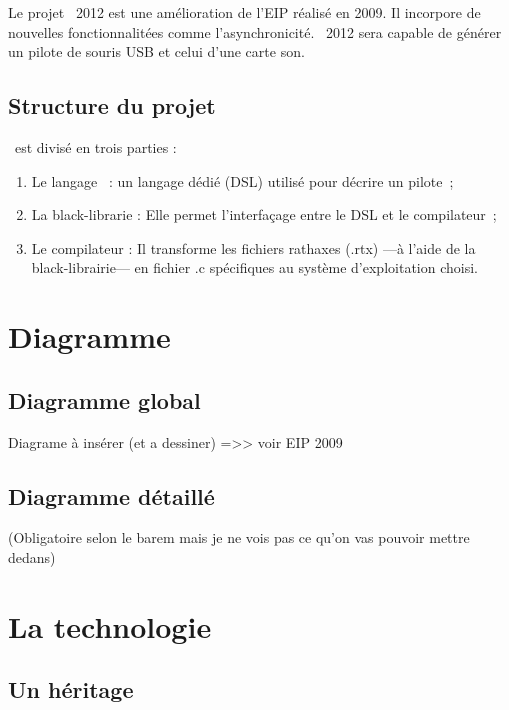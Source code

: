 \documentclass{rtxreport}
\begin{document}
Le projet \rtx\ 2012 est une amélioration de l'EIP réalisé en 2009. Il
incorpore de nouvelles fonctionnalitées comme l’asynchronicité. \rtx\ 2012 sera
capable de générer un pilote de souris USB et celui d'une carte son.

\section{Structure du projet}

\rtx\ est divisé en trois parties :

\begin{enumerate}
\item Le langage \rtx\ : un langage dédié (DSL) utilisé pour décrire un pilote~;
\item La black-librarie : Elle permet l'interfaçage entre le DSL et le
compilateur~;
\item Le compilateur : Il transforme les fichiers rathaxes (.rtx) ---à l'aide
de la black-librairie--- en fichier .c spécifiques au système d'exploitation choisi.
\end{enumerate}

\chapter{Diagramme}

\section{Diagramme global}

Diagrame à insérer (et a dessiner)
=>> voir EIP 2009

\section{Diagramme détaillé}

(Obligatoire selon le barem mais je ne vois pas ce qu'on vas pouvoir
mettre dedans)

\chapter{La technologie \rtx}

\section{Un héritage}
\end{document}

